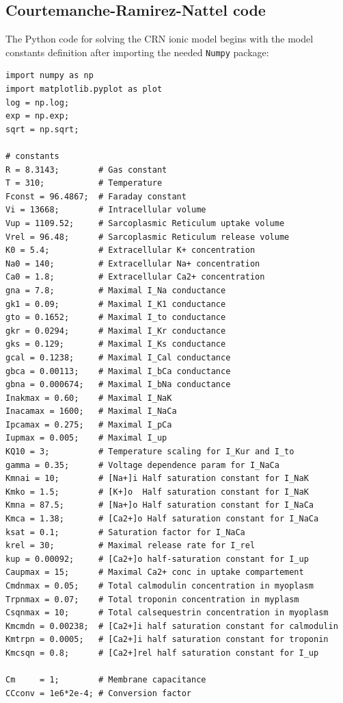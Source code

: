 \documentclass[11pt,a4paper]{article}
\begin{document}
\subsection{Courtemanche-Ramirez-Nattel code}\label{subsec:python_crn}
The Python code for solving the CRN ionic model begins with the model constants definition after importing the needed \verb|Numpy| package:
\lstset{language=Python}
\lstset{frame=lines}
\lstset{basicstyle=\footnotesize}
\begin{lstlisting}
import numpy as np  
import matplotlib.pyplot as plot
log = np.log;
exp = np.exp;
sqrt = np.sqrt;

# constants 
R = 8.3143;        # Gas constant 
T = 310;           # Temperature  
Fconst = 96.4867;  # Faraday constant 
Vi = 13668;        # Intracellular volume 
Vup = 1109.52;     # Sarcoplasmic Reticulum uptake volume 
Vrel = 96.48;      # Sarcoplasmic Reticulum release volume
K0 = 5.4;          # Extracellular K+ concentration 
Na0 = 140;         # Extracellular Na+ concentration
Ca0 = 1.8;         # Extracellular Ca2+ concentration 
gna = 7.8;         # Maximal I_Na conductance 
gk1 = 0.09;        # Maximal I_K1 conductance 
gto = 0.1652;      # Maximal I_to conductance 
gkr = 0.0294;      # Maximal I_Kr conductance 
gks = 0.129;       # Maximal I_Ks conductance 
gcal = 0.1238;     # Maximal I_Cal conductance 
gbca = 0.00113;    # Maximal I_bCa conductance 
gbna = 0.000674;   # Maximal I_bNa conductance 
Inakmax = 0.60;    # Maximal I_NaK 
Inacamax = 1600;   # Maximal I_NaCa 
Ipcamax = 0.275;   # Maximal I_pCa 
Iupmax = 0.005;    # Maximal I_up 
KQ10 = 3;          # Temperature scaling for I_Kur and I_to                    
gamma = 0.35;      # Voltage dependence param for I_NaCa 
Kmnai = 10;        # [Na+]i Half saturation constant for I_NaK
Kmko = 1.5;        # [K+]o  Half saturation constant for I_NaK 
Kmna = 87.5;       # [Na+]o Half saturation constant for I_NaCa 
Kmca = 1.38;       # [Ca2+]o Half saturation constant for I_NaCa 
ksat = 0.1;        # Saturation factor for I_NaCa
krel = 30;         # Maximal release rate for I_rel 
kup = 0.00092;     # [Ca2+]o half-saturation constant for I_up 
Caupmax = 15;      # Maximal Ca2+ conc in uptake compartement 
Cmdnmax = 0.05;    # Total calmodulin concentration in myoplasm 
Trpnmax = 0.07;    # Total troponin concentration in myplasm 
Csqnmax = 10;      # Total calsequestrin concentration in myoplasm 
Kmcmdn = 0.00238;  # [Ca2+]i half saturation constant for calmodulin 
Kmtrpn = 0.0005;   # [Ca2+]i half saturation constant for troponin 
Kmcsqn = 0.8;      # [Ca2+]rel half saturation constant for I_up 

Cm     = 1;        # Membrane capacitance
CCconv = 1e6*2e-4; # Conversion factor  
\end{lstlisting}
\end{document}
